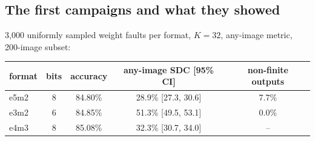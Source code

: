 \subsection{The first campaigns and what they showed}
3{,}000 uniformly sampled weight faults per format, $K=32$, any-image metric, 200-image subset:
\begin{center}
\small
\begin{tabular}{lcccc}
\toprule
format & bits & accuracy & any-image SDC [95\% CI] & non-finite outputs \\
\midrule
e5m2 & 8 & 84.80\% & 28.9\% [27.3, 30.6] & 7.7\% \\
e3m2 & 6 & 84.85\% & 51.3\% [49.5, 53.1] & 0.0\% \\
e4m3 & 8 & 85.08\% & 32.3\% [30.7, 34.0] & -- \\
\bottomrule
\end{tabular}
\end{center}

